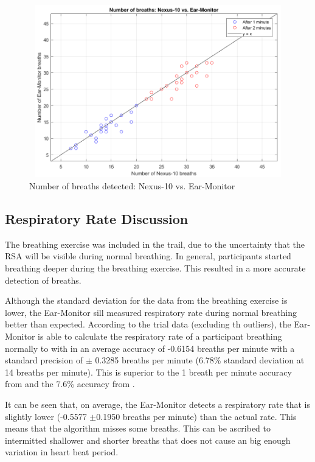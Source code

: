 \begin{figure}[H]
   \centering
   \includegraphics[width=12cm,height=7.5cm]{figs/BreathScatter.png}
   \caption{Number of breaths detected: Nexus-10 vs. Ear-Monitor}
   \label{fig:BreathScatter}
\end{figure}

\subsection{Respiratory Rate Discussion}
The breathing exercise was included in the trail, due to the uncertainty that the RSA will be visible during normal breathing. In general, participants started breathing deeper during the breathing exercise. This resulted in a more accurate detection of breaths.

\medskip

Although the standard deviation for the data from the breathing exercise is lower, the Ear-Monitor sill measured respiratory rate during normal breathing better than expected. According to the trial data (excluding th outliers), the Ear-Monitor is able to calculate the respiratory rate of a participant breathing normally to with in an average accuracy of -0.6154 breaths per minute with a standard precision of $\pm$ 0.3285 breaths per minute (6.78\% standard deviation at 14 breaths per minute). This is superior to the 1 breath per minute accuracy from \cite{clifton2007measurement} and the 7.6\% accuracy from \cite{leonard2006fully}.

\medskip

It can be seen that, on average, the Ear-Monitor detects a respiratory rate that is slightly lower (-0.5577 $\pm$0.1950 breaths per minute) than the actual rate. This means that the algorithm misses some breaths. This can be ascribed to intermitted shallower and shorter breaths that does not cause an big enough variation in heart beat period.

